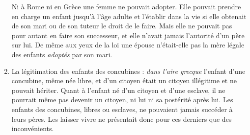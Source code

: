 \begin{enumerate}
Ni à Rome ni en Grèce une femme ne pouvait adopter. Elle pouvait
prendre en charge un enfant jusqu'à l'âge adulte et l'établir dans la
vie si elle obtenait de son mari ou de son tuteur le droit de le faire. Mais
elle ne pouvait pas pour autant en faire son successeur, et elle n'avait jamais
l'autorité d'un père sur lui. De même aux yeux de la loi une épouse
n'était-elle pas la mère légale des enfants \emph{adoptés} par son mari.
\item La légitimation des enfants des concubines : \emph{dans l'aire grecque}
l'enfant d'une concubine, même née libre, et d'un citoyen était un citoyen
illégitime et ne pouvait hériter. Quant à l'enfant né d'un citoyen et d'une
esclave, il ne pourrait même pas devenir un citoyen, ni lui ni sa postérité
après lui. Les enfants des concubines, libres ou esclaves, ne pouvaient jamais succéder à leurs pères. Les laisser vivre ne présentait donc pour
ces derniers que des inconvénients.


\end{enumerate}

